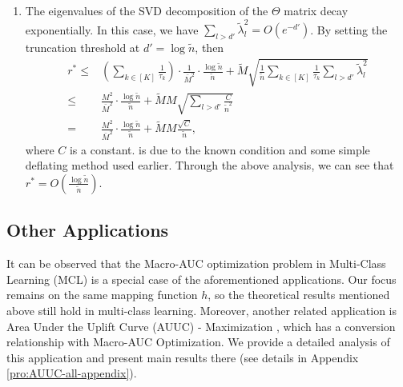 \documentclass{article}
\def\leqone{\overset{\text{\ding{172}}}{\leq}}
\begin{document}
\begin{enumerate}[(1)]
    \item The eigenvalues of the SVD decomposition of the $\Theta$ matrix decay exponentially. 
    In this case, we have $\sum_{l > d'} \widetilde{\lambda}_l^2 = O(e^{-d'})$. By setting the truncation threshold at $d' = \log \tilde{n}$,
    then 
    \begin{align*}
    r^* \leq & (\sum_{k \in [K]} \frac{1}{\tau_k}) \cdot \frac{1}{\bar{M}^2} \cdot \frac{\log \tilde{n}}{\tilde{n}}  + \widetilde{M} \sqrt{\frac{1}{\tilde{n}} \sum_{k \in [K]} \frac{1}{\tau_k} \sum_{l>d'} \widetilde{\lambda}_l^2 } \\
    \leq & \frac{M^2}{\bar{M}^2} \cdot \frac{\log \tilde{n}}{\tilde{n}} + \widetilde{M} M \sqrt{\sum_{l > d'} \frac{C}{\tilde{n}^2} }  \\ 
    = & \frac{M^2}{\bar{M}^2} \cdot \frac{\log \tilde{n}}{\tilde{n}} + \widetilde{M} M \frac{\sqrt{C}}{\tilde{n}},
    \end{align*}
    where $C$ is a constant.  is due to the known condition and some simple deflating method used earlier. Through the above analysis, we can see that $r^* = O(\frac{\log \tilde{n}}{\tilde{n}})$. 

    
\end{enumerate}



\subsection{Other Applications}
It can be observed that the Macro-AUC optimization problem in Multi-Class Learning (MCL) \cite{21multiclass} is a special case of the aforementioned applications. Our focus remains on the same mapping function $h$, so the theoretical results mentioned above still hold in multi-class learning.
Moreover, another related application is Area Under the Uplift Curve (AUUC) - Maximization \cite{aminiKDD2021uplift_Modeling}, which has a conversion relationship with Macro-AUC Optimization.
We provide a detailed analysis of this application and present main results there (see details in Appendix \ref{pro:AUUC-all-appendix}).
\end{document}
